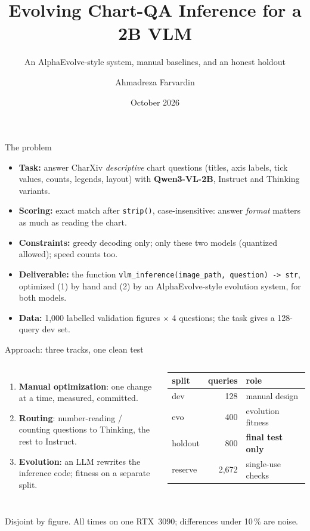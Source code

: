\documentclass[aspectratio=169,10pt]{beamer}
\title{Evolving Chart-QA Inference for a 2B VLM}
\subtitle{An AlphaEvolve-style system, manual baselines, and an honest holdout}
\author{Ahmadreza Farvardin}
\date{October 2026}
\begin{document}
\maketitle

\begin{frame}{The problem}
\begin{itemize}
  \item \textbf{Task:} answer CharXiv \emph{descriptive} chart questions (titles, axis labels, tick values, counts,
        legends, layout) with \textbf{Qwen3-VL-2B}, Instruct and Thinking variants.
  \item \textbf{Scoring:} exact match after \texttt{strip()}, case-insensitive: answer \emph{format} matters as much as
        reading the chart.
  \item \textbf{Constraints:} greedy decoding only; only these two models (quantized allowed); speed counts too.
  \item \textbf{Deliverable:} the function \texttt{vlm\_inference(image\_path, question) -> str}, optimized
        (1) by hand and (2) by an AlphaEvolve-style evolution system, for both models.
  \item \textbf{Data:} 1{,}000 labelled validation figures $\times$ 4 questions; the task gives a 128-query dev set.
\end{itemize}
\end{frame}

\begin{frame}{Approach: three tracks, one clean test}
\begin{columns}[T]
\begin{enumerate}
  \item \textbf{Manual optimization}: one change at a time, measured, committed.
  \item \textbf{Routing}: number-reading / counting questions to Thinking, the rest to Instruct.
  \item \textbf{Evolution}: an LLM rewrites the inference code; fitness on a separate split.
\end{enumerate}
\small
\begin{tabular}{@{}lrl@{}}
\toprule
split & queries & role \\
\midrule
dev & 128 & manual design \\
evo & 400 & evolution fitness \\
holdout & 800 & \textbf{final test only} \\
reserve & 2{,}672 & single-use checks \\
\bottomrule
\end{tabular}
\end{columns}
\vspace{1em}
Disjoint by figure. All times on one RTX~3090; differences under 10\,\% are noise.
\end{frame}
\end{document}
